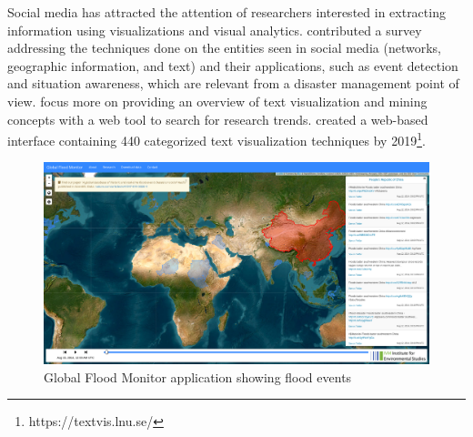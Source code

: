 Social media has attracted the attention of researchers interested in extracting information using
visualizations and visual analytics.  contributed a survey
addressing the techniques done on the entities seen in social media (networks, geographic information,
and text) and their applications, such as event detection and situation awareness, which are
relevant from a disaster management point of view. 
focus more on providing an overview of text visualization and mining concepts with a web tool to
search for research trends.  created a web-based
interface containing 440 categorized text visualization techniques by
2019\footnote{https://textvis.lnu.se/}.

\begin{figure}[ht!]
\begin{center}
  \includegraphics[width=\columnwidth]{images/global.png}
\end{center}
\caption{Global Flood Monitor application showing flood events}
\label{fig:global}
\end{figure}

